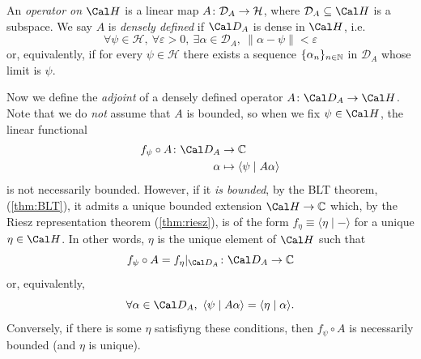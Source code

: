 \begin{definition}
  An \emph{operator on \(\Cal H\)} is a
  linear map $A\colon\mathcal{D}_A\to\mathcal{H}$,
  where $\mathcal{D}_A\subseteq\Cal H$ is a subspace.
  We say \(A\) is \emph{densely defined} if \(\Cal D_A\) is dense in
  \(\Cal H\), i.e.
  \begin{equation*}
    \forall \psi\in \mathcal{H}, \
    \forall \varepsilon > 0, \
    \exists \alpha \in \mathcal{D}_A, \
    \|\alpha - \psi\|< \varepsilon
  \end{equation*}
  or, equivalently, if for every $\psi\in\mathcal{H}$ there exists a
  sequence $\{\alpha_n\}_{n\in\mathbb{N}}$ in $\mathcal{D}_A$ whose limit is
  $\psi$.
\end{definition}
Now we define the \emph{adjoint} of a densely defined operator
\(A\colon\Cal D_A\to\Cal H\).
Note that we do \emph{not} assume that \(A\) is bounded, so when we
fix \(\psi\in\Cal H\), the linear functional
\begin{align*}
  f_\psi\circ A \colon \Cal D_A &\to \C \\
  \alpha &\mapsto \langle \psi \mid A\alpha \rangle
\end{align*}
is not necessarily bounded. However, if it \emph{is bounded},
by the BLT theorem, (\cref{thm:BLT}), it admits a unique
bounded extension \(\Cal H\to\C\) which, by the Riesz
representation theorem (\cref{thm:riesz}), is
of the form \(f_\eta\equiv\langle\eta\mid-\rangle\) for a unique
\(\eta\in\Cal H\).
In other words, \(\eta\) is the unique element of \(\Cal H\) such that
\begin{equation}
  f_\psi\circ A = f_{\eta}|_{\Cal D_A} \colon\Cal D_A\to\C
\end{equation}
or, equivalently,
\begin{equation}
  \forall\alpha\in\Cal D_A, \
  \langle \psi\mid A\alpha\rangle
  =
  \langle \eta\mid \alpha\rangle.
\end{equation}
Conversely, if there is some \(\eta\) satisfiyng these conditions,
then \(f_\psi\circ A\) is necessarily bounded (and \(\eta\) is unique).

